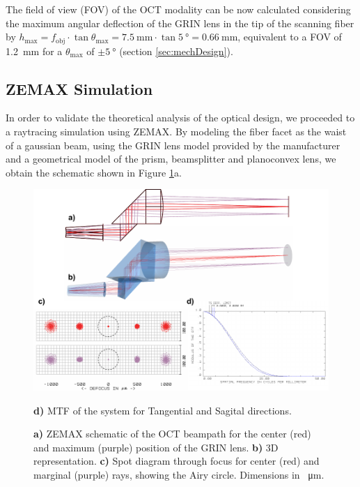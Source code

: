 The field of view (FOV) of the OCT modality can be now calculated considering the maximum angular deflection of the GRIN lens in the tip of the scanning fiber by 
$h_\mathrm{max} = f_\mathrm{obj}\cdot \tan  \theta_\mathrm{max} = \SI{7.5}{\milli\meter} \cdot \tan \SI{5}{\degree} = \SI{0.66}{\milli\meter}$, 
equivalent to a FOV of \SI{1.2}{\milli\meter} for a $\theta_\mathrm{max} $ of $ \pm \SI{5}{\degree}$ (section \ref{sec:mechDesign}).


\subsection*{ZEMAX Simulation}

In order to validate the theoretical analysis of the optical design, we proceeded to a raytracing simulation using ZEMAX. By modeling the fiber facet as the waist of a gaussian beam, using the GRIN lens model provided by the manufacturer and a geometrical model of the prism, beamsplitter and planoconvex lens, we obtain the schematic shown in Figure \ref{fig:BS}a. 

\begin{figure}[h!]\centering
      \includegraphics[width=\columnwidth]{figures/30_DesignSimulation/Optical/beamsplitterAll.pdf}
      \caption{\textbf{a)} ZEMAX schematic of the OCT beampath for the center (red) and maximum (purple) position of the GRIN lens.
      \textbf{b)} 3D representation.
      \textbf{c)} Spot diagram through focus for center (red) and marginal (purple) rays, showing the Airy circle. Dimensions in \SI{}{\micro\meter}.}
      \textbf{d)} MTF of the system for Tangential and Sagital directions.
      \label{fig:BS}
\end{figure}

